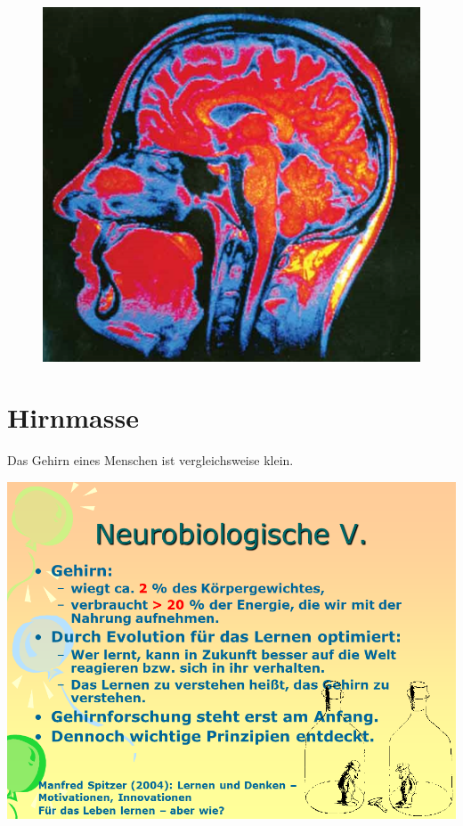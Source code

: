 \documentclass[
  letterpaper,
]{scrbook}
\begin{document}
\begin{figure}

{\centering 

\href{https://www.kissclipart.com/tongue-twister-cartoon-comics-stop-consonant-m2n92r/}{\includegraphics[width=1\textwidth,height=\textheight]{./pictures/brain_scan.png}}

}

\end{figure}

\hypertarget{hirnmasse}{%
\section{Hirnmasse}\label{hirnmasse}}

Das Gehirn eines Menschen ist vergleichsweise klein.

\includegraphics[width=1\textwidth,height=\textheight]{./pictures/neuro/Diapozitiv9.PNG}
\end{document}
